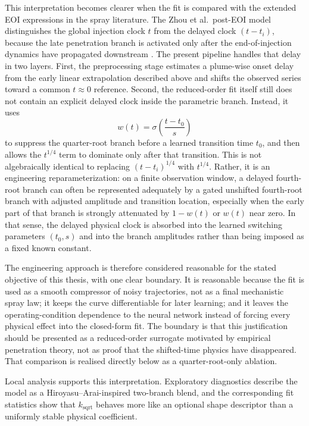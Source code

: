 \documentclass[english, 12pt, a4paper, elec, utf8, a-2b, online]{aaltothesis}
\begin{document}
This interpretation becomes clearer when the fit is compared with the extended EOI expressions in the spray literature. The Zhou et al.\ post-EOI model distinguishes the global injection clock \(t\) from the delayed clock \((t-t_i)\), because the late penetration branch is activated only after the end-of-injection dynamics have propagated downstream \cite{ZhouLiLaiWei2019}. The present pipeline handles that delay in two layers. First, the preprocessing stage estimates a plume-wise onset delay from the early linear extrapolation described above and shifts the observed series toward a common \(t\approx 0\) reference. Second, the reduced-order fit itself still does not contain an explicit delayed clock inside the parametric branch. Instead, it uses
\[
w(t)=\sigma\!\left(\frac{t-t_0}{s}\right)
\]
to suppress the quarter-root branch before a learned transition time \(t_0\), and then allows the \(t^{1/4}\) term to dominate only after that transition. This is not algebraically identical to replacing \((t-t_i)^{1/4}\) with \(t^{1/4}\). Rather, it is an engineering reparameterization: on a finite observation window, a delayed fourth-root branch can often be represented adequately by a gated unshifted fourth-root branch with adjusted amplitude and transition location, especially when the early part of that branch is strongly attenuated by \(1-w(t)\) or \(w(t)\) near zero. In that sense, the delayed physical clock is absorbed into the learned switching parameters \((t_0,s)\) and into the branch amplitudes rather than being imposed as a fixed known constant.

The engineering approach is therefore considered reasonable for the stated objective of this thesis, with one clear boundary. It is reasonable because the fit is used as a smooth compressor of noisy trajectories, not as a final mechanistic spray law; it keeps the curve differentiable for later learning; and it leaves the operating-condition dependence to the neural network instead of forcing every physical effect into the closed-form fit. The boundary is that this justification should be presented as a reduced-order surrogate motivated by empirical penetration theory, not as proof that the shifted-time physics have disappeared. That comparison is realised directly below as a quarter-root-only ablation.

Local analysis supports this interpretation. Exploratory diagnostics describe the model as a Hiroyasu--Arai-inspired two-branch blend, and the corresponding fit statistics show that \(k_{\mathrm{sqrt}}\) behaves more like an optional shape descriptor than a uniformly stable physical coefficient.
\end{document}
